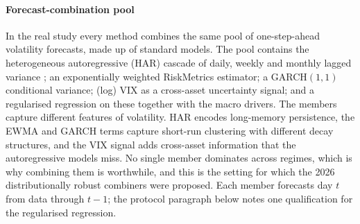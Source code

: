 \documentclass[authoryear,preprint,12pt]{elsarticle}
\theoremstyle{plain}
\theoremstyle{remark}
\begin{document}
\paragraph{Forecast-combination pool}
In the real study every method combines the same pool of one-step-ahead volatility
forecasts, made up of standard models. The pool contains the heterogeneous
autoregressive (HAR) cascade of daily, weekly and monthly lagged variance
\citep{corsi2009har}; an exponentially weighted RiskMetrics estimator; a GARCH$(1,1)$
conditional variance; (log) VIX as a cross-asset uncertainty signal; and a regularised
regression on these together with the macro drivers. The members capture different
features of volatility. HAR encodes long-memory persistence, the EWMA and GARCH terms
capture short-run clustering with different decay structures, and the VIX signal adds
cross-asset information that the autoregressive models miss. No single member
dominates across regimes, which is why combining them is worthwhile, and this is the
setting for which the 2026 distributionally robust combiners were proposed. Each member forecasts day $t$ from data through $t-1$; the protocol paragraph below notes one qualification for the regularised regression.
\end{document}

